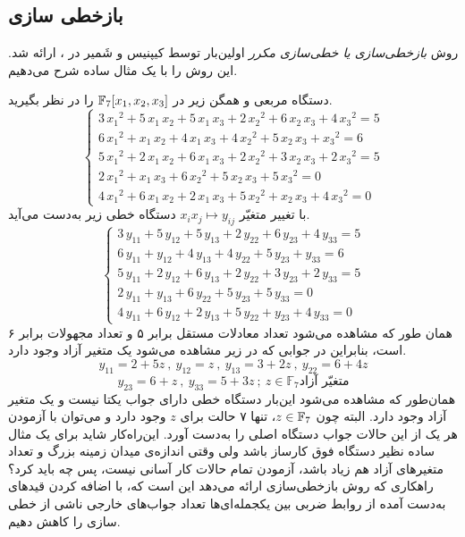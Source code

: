 \subsection{بازخطی سازی}
روش 
\textit{بازخطی‌سازی یا خطی‌سازی مکرر}
 اولین‌بار توسط کیپنیس
و
شَمیر
در 
{\small \cite{kipnis1999cryptanalysis}}
، ارائه شد. این روش را با یک مثال ساده شرح می‌دهیم.
\begin{example}
	\label{relinearization example}
دستگاه مربعی و همگن زیر در 
$\mathbb{F}_{7}[x_{1},x_{2},x_{3}]$
را در نظر بگیرید.
	$$\left \{ \begin{array}{l}
	3\,{x_{1}}^{2}+5\,x_{1}\,x_{2}+5\,x_{1}\,x_{3}+2\,{x_{2}}^{2}+6\,x_{2}
	\,x_{3}+4\,{x_{3}}^{2}=5
	\\
	6\,{x_{1}}^{2}+x_{1}\,x_{2}+4\,x_{1}\,x_{3}+4\,{x_{2}}^{2}+5\,x_{2}\,x
	_{3}+{x_{3}}^{2}=6
	\\
	5\,{x_{1}}^{2}+2\,x_{1}\,x_{2}+6\,x_{1}\,x_{3}+2\,{x_{2}}^{2}+3\,x_{2}
	\,x_{3}+2\,{x_{3}}^{2}=5
	\\
	2\,{x_{1}}^{2}+x_{1}\,x_{3}+6\,{x_{2}}^{2}+5\,x_{2}\,x_
	{3} + 5\,{x_{3}}^{2}=0
	\\
	4\,{x_{1}}^{2}+6\,x_{1}\,x_{2}+2\,x_{1}\,x_{3}+5\,{x_{2}}^{2}+x_{2}\,x
	_{3}+4\,{x_{3}}^{2}=0
	\end{array} \right.$$
	با تغییر متغیّر 
	$x_{i}x_{j}\mapsto y_{ij}$
	دستگاه خطی زیر به‌دست  می‌آید.
	$$\left \{ \begin{array}{l}
	3\,y_{11}+5\,y_{12}+5\,y_{13}+2\,y_{22}+6\,y_{23}+4\,y_{33}=5\\
	6\,y_{11}+y_{12}+4\,y_{13}+4\,y_{22}+5\,y_{23}+y_{33}=6\\
	5\,y_{11}+2\,y_{12}+6\,y_{13}+2\,y_{22}+3\,y_{23}+2\,y_{33}=5\\
	2\,y_{11}+y_{13}+6\,y_{22}+5\,y_{23}+5\,y_{33}=0\\
	4\,y_{11}+6\,y_{12}+2\,y_{13}+5\,y_{22}+y_{23}+4\,y_{33}=0
	\end{array} \right.$$
همان ‌طور که مشاهده می‌شود تعداد معادلات مستقل برابر ۵ و تعداد  مجهولات برابر ۶ است، بنابراین در جوابی که در زیر مشاهده می‌شود یک متغیر آزاد وجود دارد.
\begin{equation}
\label{relinearization z}
y_{11} = 2+5z \ , \ y_{12} = z \ , \ y_{13} = 3+2z \ , \ y_{22} = 6+4z
\end{equation}
$$y_{23} = 6+z \ , \ y_{33} = 5+3z \ ; \ z\in \mathbb{F}_{7}\text{متغیّر آزاد}$$
همان‌طور که مشاهده می‌شود این‌بار دستگاه خطی دارای جواب یکتا نیست و یک متغیر آزاد وجود دارد. البته چون  
$z\in\mathbb{F}_{7}$، 
 تنها ۷ حالت برای 
$z$
وجود دارد و می‌توان با آزمودن هر یک از این حالات جواب دستگاه اصلی را به‌دست  آورد. این‌راه‌کار شاید برای یک مثال ساده نظیر دستگاه فوق کارساز باشد ولی وقتی اندازه‌ی میدان زمینه بزرگ  و تعداد متغیرهای آزاد هم زیاد باشد، آزمودن تمام حالات کار آسانی نیست، پس چه باید کرد؟ راهکاری که روش بازخطی‌سازی ارائه می‌دهد این است که، با اضافه کردن قیدهای به‌دست  آمده از روابط ضربی بین یکجمله‌ای‌ها تعداد جواب‌های خارجی ناشی از خطی سازی را کاهش  دهیم. 


\end{example}

